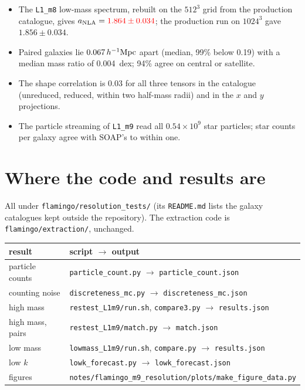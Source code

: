 \documentclass[11pt]{article}
\newcommand{\Mpch}{\,h^{-1}{\rm Mpc}}
\newcommand{\anla}{a_{\rm NLA}}
\newcommand{\run}[1]{\texttt{#1}}
\newif\ifnumbersfinal
\newcommand{\refresh}[1]{\ifnumbersfinal#1\else\textcolor{red}{#1}\fi}
\newcommand{\anlaLMeight}{\refresh{\ensuremath{1.864 \pm 0.034}}}
\newcommand{\anlaProd}{\ensuremath{1.856 \pm 0.034}}
\newcommand{\NstarsLnine}{\ensuremath{0.54\times10^{9}}}
\begin{document}
\begin{itemize}
  \item The \run{L1\_m8} low-mass spectrum, rebuilt on the $512^3$ grid from
    the production catalogue, gives $\anla = \anlaLMeight$; the production run
    on $1024^3$ gave $\anlaProd$.
  \item Paired galaxies lie $0.067\Mpch$ apart (median, 99\% below 0.19) with
    a median mass ratio of 0.004~dex; 94\% agree on central or satellite.
  \item The shape correlation is 0.03 for all three tensors in the catalogue
    (unreduced, reduced, within two half-mass radii) and in the $x$ and $y$
    projections.
  \item The particle streaming of \run{L1\_m9} read all \NstarsLnine{} star
    particles; star counts per galaxy agree with SOAP's to within one.
\end{itemize}

\section{Where the code and results are}
\label{app:code}

All under \texttt{flamingo/resolution\_tests/} (its \texttt{README.md} lists the
galaxy catalogues kept outside the repository). The extraction code is
\texttt{flamingo/extraction/}, unchanged.
\begin{center}
  \begin{tabular}{ll}
    \toprule
    result & script $\rightarrow$ output \\
    \midrule
    particle counts & \texttt{particle\_count.py} $\rightarrow$ \texttt{particle\_count.json} \\
    counting noise & \texttt{discreteness\_mc.py} $\rightarrow$ \texttt{discreteness\_mc.json} \\
    high mass & \texttt{restest\_L1m9/run.sh}, \texttt{compare3.py} $\rightarrow$ \texttt{results.json} \\
    high mass, pairs & \texttt{restest\_L1m9/match.py} $\rightarrow$ \texttt{match.json} \\
    low mass & \texttt{lowmass\_L1m9/run.sh}, \texttt{compare.py} $\rightarrow$ \texttt{results.json} \\
    low $k$ & \texttt{lowk\_forecast.py} $\rightarrow$ \texttt{lowk\_forecast.json} \\
    figures & \texttt{notes/flamingo\_m9\_resolution/plots/make\_figure\_data.py} \\
    \bottomrule
  \end{tabular}
\end{center}
\end{document}
